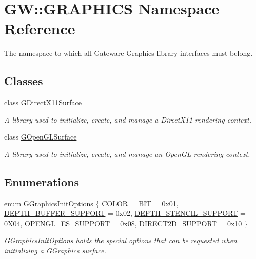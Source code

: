 \hypertarget{namespaceGW_1_1GRAPHICS}{}\section{GW\+:\+:G\+R\+A\+P\+H\+I\+CS Namespace Reference}
\label{namespaceGW_1_1GRAPHICS}


The namespace to which all Gateware Graphics library interfaces must belong.  


\subsection*{Classes}
\begin{DoxyCompactItemize}
\item 
class \mbox{\hyperlink{classGW_1_1GRAPHICS_1_1GDirectX11Surface}{G\+Direct\+X11\+Surface}}
\begin{DoxyCompactList}\small\item\em A library used to initialize, create, and manage a Direct\+X11 rendering context. \end{DoxyCompactList}\item 
class \mbox{\hyperlink{classGW_1_1GRAPHICS_1_1GOpenGLSurface}{G\+Open\+G\+L\+Surface}}
\begin{DoxyCompactList}\small\item\em A library used to initialize, create, and manage an Open\+GL rendering context. \end{DoxyCompactList}\end{DoxyCompactItemize}
\subsection*{Enumerations}
\begin{DoxyCompactItemize}
\item 
enum \mbox{\hyperlink{namespaceGW_1_1GRAPHICS_afbd9d6f65375744d2338ce060d42c85b}{G\+Graphics\+Init\+Options}} \{ \newline
\mbox{\hyperlink{namespaceGW_1_1GRAPHICS_afbd9d6f65375744d2338ce060d42c85ba955a3a5f0ed41c744182916c5bf68e15}{C\+O\+L\+O\+R\+\_\+\_\+\+B\+IT}} = 0x01, 
\mbox{\hyperlink{namespaceGW_1_1GRAPHICS_afbd9d6f65375744d2338ce060d42c85ba1bade4c85d55718f2b27dcc38c332a3a}{D\+E\+P\+T\+H\+\_\+\+B\+U\+F\+F\+E\+R\+\_\+\+S\+U\+P\+P\+O\+RT}} = 0x02, 
\mbox{\hyperlink{namespaceGW_1_1GRAPHICS_afbd9d6f65375744d2338ce060d42c85bacac34b90e4af450189dd5e824cbbd452}{D\+E\+P\+T\+H\+\_\+\+S\+T\+E\+N\+C\+I\+L\+\_\+\+S\+U\+P\+P\+O\+RT}} = 0\+X04, 
\mbox{\hyperlink{namespaceGW_1_1GRAPHICS_afbd9d6f65375744d2338ce060d42c85bae59cf357d12d379a206c08211dedc57f}{O\+P\+E\+N\+G\+L\+\_\+\+E\+S\+\_\+\+S\+U\+P\+P\+O\+RT}} = 0x08, 
\newline
\mbox{\hyperlink{namespaceGW_1_1GRAPHICS_afbd9d6f65375744d2338ce060d42c85ba9c847baaca0bdcb897b2332cc8d3b5dc}{D\+I\+R\+E\+C\+T2\+D\+\_\+\+S\+U\+P\+P\+O\+RT}} = 0x10
 \}
\begin{DoxyCompactList}\small\item\em G\+Graphics\+Init\+Options holds the special options that can be requested when initializing a G\+Graphics surface. \end{DoxyCompactList}\end{DoxyCompactItemize}
